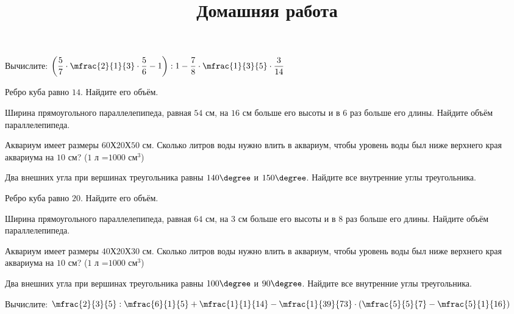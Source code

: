 \begin{consultation}
	\begin{listofex}
		\item Вычислите: \quad \( \left( \dfrac{5}{7}\cdot\mfrac{2}{1}{3}\cdot\dfrac{5}{6}-1 \right):1-\dfrac{7}{8}\cdot\mfrac{1}{3}{5}\cdot\dfrac{3}{14} \)
		\item Ребро куба равно \( 14 \). Найдите его объём.
		\item Ширина прямоугольного параллелепипеда, равная \( 54 \) см, на \( 16 \) см больше его высоты и в \( 6 \) раз больше его длины. Найдите объём параллелепипеда.
		\item Аквариум имеет размеры \( 60 \)Х\( 20 \)Х\( 50 \) см. Сколько литров воды нужно влить в аквариум, чтобы уровень воды был ниже верхнего края аквариума на \( 10 \) см? (\( 1 \) л =\( 1000 \) см\( ^3 \))
		\item Два внешних угла при вершинах треугольника равны \( 140\degree \) и \( 150\degree \). Найдите все внутренние углы треугольника.
	\end{listofex}
	\newpage
	\title{Домашняя работа}
	\begin{listofex}
	\item Ребро куба равно \( 20 \). Найдите его объём.
	\item Ширина прямоугольного параллелепипеда, равная \( 64 \) см, на \( 3 \) см больше его высоты и в \( 8 \) раз больше его длины. Найдите объём параллелепипеда.
	\item Аквариум имеет размеры \( 40 \)Х\( 20 \)Х\( 30 \) см. Сколько литров воды нужно влить в аквариум, чтобы уровень воды был ниже верхнего края аквариума на \( 10 \) см? (\( 1 \) л =\( 1000 \) см\( ^3 \))
	\item Два внешних угла при вершинах треугольника равны \( 100\degree \) и \( 90\degree \). Найдите все внутренние углы треугольника.
	\item Вычислите: \quad \( \mfrac{2}{3}{5}:\mfrac{6}{1}{5}+\mfrac{1}{1}{14}-\mfrac{1}{39}{73}\cdot\left( \mfrac{5}{5}{7}-\mfrac{5}{1}{16} \right) \)
	\end{listofex}
\end{consultation}

